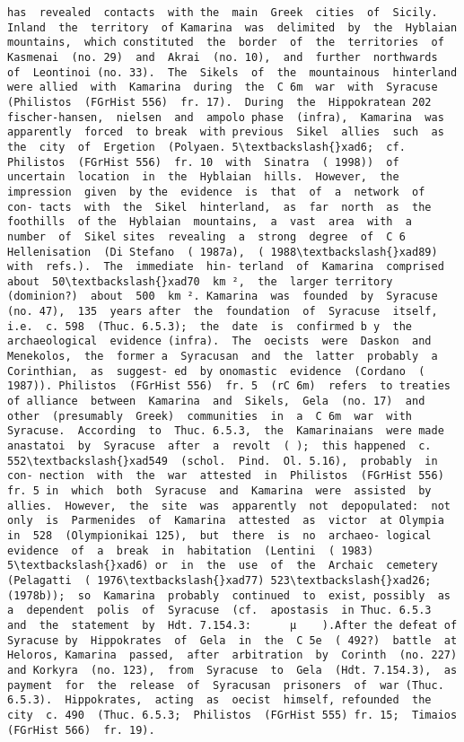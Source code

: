 \documentclass[11pt]{article}
\begin{document}
\begin{Verbatim}[commandchars=\\\{\}]
 has  revealed  contacts  with the  main  Greek  cities  of  Sicily.  Inland  the  territory  of Kamarina  was  delimited  by  the  Hyblaian  mountains,  which constituted  the  border  of  the  territories  of  Kasmenai  (no. 29)  and  Akrai  (no. 10),  and  further  northwards  of  Leontinoi (no. 33).  The  Sikels  of  the  mountainous  hinterland  were allied  with  Kamarina  during  the  C 6m  war  with  Syracuse (Philistos  (FGrHist 556)  fr. 17).  During  the  Hippokratean 202 fischer-hansen,  nielsen  and  ampolo phase  (infra),  Kamarina  was  apparently  forced  to break  with previous  Sikel  allies  such  as  the  city  of  Ergetion  (Polyaen. 5\textbackslash{}xad6;  cf.  Philistos  (FGrHist 556)  fr. 10  with  Sinatra  ( 1998))  of uncertain  location  in  the  Hyblaian  hills.  However,  the impression  given  by the  evidence  is  that  of  a  network  of  con- tacts  with  the  Sikel  hinterland,  as  far  north  as  the  foothills  of the  Hyblaian  mountains,  a  vast  area  with  a  number  of  Sikel sites  revealing  a  strong  degree  of  C 6  Hellenisation  (Di Stefano  ( 1987a),  ( 1988\textbackslash{}xad89)  with  refs.).  The  immediate  hin- terland  of  Kamarina  comprised  about  50\textbackslash{}xad70  km ²,  the  larger territory  (dominion?)  about  500  km ². Kamarina  was  founded  by  Syracuse  (no. 47),  135  years after  the  foundation  of  Syracuse  itself,  i.e.  c. 598  (Thuc. 6.5.3);  the  date  is  confirmed b y  the  archaeological  evidence (infra).  The  oecists  were  Daskon  and  Menekolos,  the  former a  Syracusan  and  the  latter  probably  a  Corinthian,  as  suggest- ed  by onomastic  evidence  (Cordano  ( 1987)). Philistos  (FGrHist 556)  fr. 5  (rC 6m)  refers  to treaties  of alliance  between  Kamarina  and  Sikels,  Gela  (no. 17)  and other  (presumably  Greek)  communities  in  a  C 6m  war  with Syracuse.  According  to  Thuc. 6.5.3,  the  Kamarinaians  were made  anastatoi  by  Syracuse  after  a  revolt  ( );  this happened  c. 552\textbackslash{}xad549  (schol.  Pind.  Ol. 5.16),  probably  in  con- nection  with  the  war  attested  in  Philistos  (FGrHist 556)  fr. 5 in  which  both  Syracuse  and  Kamarina  were  assisted  by allies.  However,  the  site  was  apparently  not  depopulated:  not only  is  Parmenides  of  Kamarina  attested  as  victor  at Olympia  in  528  (Olympionikai 125),  but  there  is  no  archaeo- logical  evidence  of  a  break  in  habitation  (Lentini  ( 1983)  5\textbackslash{}xad6) or  in  the  use  of  the  Archaic  cemetery  (Pelagatti  ( 1976\textbackslash{}xad77) 523\textbackslash{}xad26;(1978b));  so  Kamarina  probably  continued  to  exist, possibly  as  a  dependent  polis  of  Syracuse  (cf.  apostasis  in Thuc. 6.5.3  and  the  statement  by  Hdt. 7.154.3:      µ    ).After the defeat of  Syracuse by  Hippokrates  of  Gela  in  the  C 5e  ( 492?)  battle  at  Heloros, Kamarina  passed,  after  arbitration  by  Corinth  (no. 227)  and Korkyra  (no. 123),  from  Syracuse  to  Gela  (Hdt. 7.154.3),  as payment  for  the  release  of  Syracusan  prisoners  of  war (Thuc. 6.5.3).  Hippokrates,  acting  as  oecist  himself, refounded  the  city  c. 490  (Thuc. 6.5.3;  Philistos  (FGrHist 555) fr. 15;  Timaios  (FGrHist 566)  fr. 19).  
\end{Verbatim}
\end{document}
